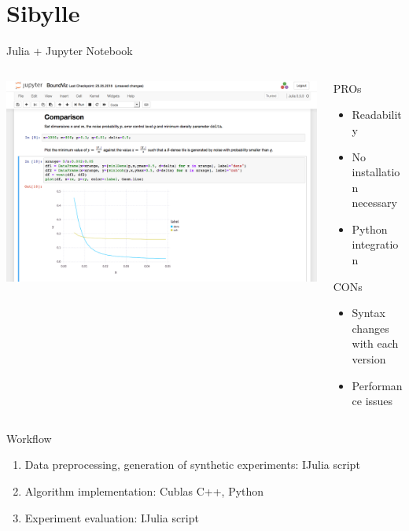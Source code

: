 \documentclass[aspectratio=169,10pt]{beamer}
\begin{document}
\section{Sibylle}
\begin{frame}[fragile]{Julia + Jupyter Notebook}
\begin{columns}
\begin{column}{0.7\textwidth}
\includegraphics[width=\textwidth]{julia.png}
\end{column}
\begin{column}{0.25\textwidth}
PROs
\begin{itemize}
    \item Readability
    \item No installation necessary
    \item Python integration
\end{itemize}
CONs
\begin{itemize}
    \item Syntax changes with each version
    \item Performance issues
\end{itemize}
\end{column}
\end{columns}
\end{frame}

\begin{frame}[t,fragile]{Workflow}
\begin{enumerate}
    \item Data preprocessing, generation of synthetic experiments: IJulia script
    \item Algorithm implementation: Cublas C++, Python
    \item Experiment evaluation: IJulia script
\end{enumerate}
\end{frame}
\end{document}
